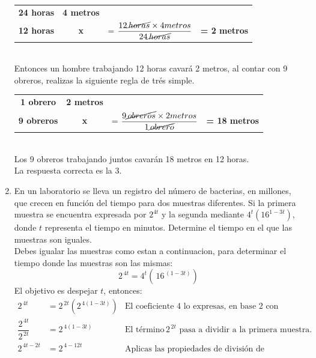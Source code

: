 \documentclass[11pt, a4paper]{article} %
\theoremstyle{dotlessP}
\theoremstyle{dotlessS}
\begin{document}
\begin{enumerate}[label=\color{dg}\theenumi.]
	\begin{table}[htbp]
	\centering
		\begin{tabular}{cccc}
		\textbf{24 horas} & \textbf{4 metros} &             &                  \\
		\textbf{12 horas} & \textbf{x}        & = 					$\displaystyle\frac{12 \cancel{\,horas} \times 4 			metros }{24 \cancel {\,horas}}$ & \textbf{= 2 metros}
		\end{tabular}
	\end{table}
 	\\ 
	Entonces un hombre trabajando 12 horas  cavará 2 metros, 	al contar con 9 obreros, realizas la siguiente regla de 	trés simple.
	\begin{table}[htbp]
	\centering
		\begin{tabular}{cccc}
		\textbf{1 obrero} & \textbf{2 metros} &             &                  \\
		\textbf{9 obreros} & \textbf{x}      &= 					$\displaystyle\frac{9 \cancel{\,obreros} \times 2 			metros }{1 \cancel {\,obrero}}$ & \textbf{= 18 				metros}
 		\end{tabular}
	\end{table}
       \\
	Los 9 obreros trabajando juntos cavarán 18 metros en 12 	horas.    \\
	{\color{dh} La respuesta correcta es la 3.}
	\\
\item {\color{db} En un laboratorio se lleva un registro del número de bacterias, en millones, que crecen en función del tiempo para dos muestras diferentes. Si la primera muestra se encuentra expresada por \(2^{4t}\) y  la segunda mediante \(4^t (16^{1 - 3t})\), donde \(t\) representa el tiempo en minutos. Determine el tiempo en el que las muestras son iguales.}
    \\ Debes igualar las muestras como estan a continuacion, para determinar el tiempo donde las muestras son las mismas:
\[
2^{\,4t}  = 4^t(\,16^{\,(1 - 3t)})
\]
El objetivo es despejar \(t\), entonces: 
\begin{align*}
2^{\,4t}  &= 2^{\,2t}(2^{\,4(1 - 3t)})   &{\text{El coeficiente 4 lo expresas, en base 2 con exponente 2.}}  
\\
\dfrac{2^{\,4t}}{2^{\,2t}}  &=  2^{\,4(1 - 3t)}  &{\text{El término}\, {2^{\,2t}}  \text{ pasa a dividir a la primera muestra.}} 
\\
2^{\,4t-2t}  &= 2^{\,4 - 12t} &\text{Aplicas las propiedades de división de fracciones.}  

\end{align*}
\end{enumerate}
\end{document}
